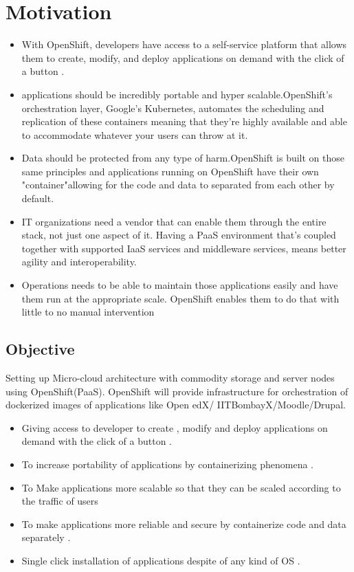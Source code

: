 \documentclass[11pt]{report}
\begin{document}
	\chapter{Motivation}
	\vspace{1cm}
	\large
	\begin{itemize}
		\item
		With OpenShift, developers have access to a self-service platform that allows them to create, modify, and deploy applications on demand with the click of a button .
		\vspace{0.3cm}
		\item 
		applications should be incredibly portable and hyper scalable.OpenShift's orchestration layer, Google’s Kubernetes, automates the scheduling and replication of these containers meaning that they're highly available and able to accommodate whatever your users can throw at it.
		\vspace{0.3cm}
		\item
		Data should be protected from any type of harm.OpenShift is built on those same principles and applications running on OpenShift have their own "container"allowing for the code and data to separated from each other by default.
		\vspace{0.3cm}
		\item
		IT organizations need a vendor that can enable them through the entire stack, not just one aspect of it. Having a PaaS environment that’s coupled together with supported IaaS services and middleware services, means better agility and interoperability.
		\vspace{0.3cm}
		\item
		Operations needs to be able to maintain those applications easily and have them run at the appropriate scale. OpenShift enables them to do that with little to no manual intervention
	\end{itemize}
	\section{Objective}
	Setting up Micro-cloud architecture with commodity storage and server nodes using OpenShift(PaaS). OpenShift will provide infrastructure for orchestration of dockerized images of applications like Open edX/ IITBombayX/Moodle/Drupal.
	
	\begin{itemize}
		\item Giving access to developer to create , modify and deploy applications on demand with the click of a button .
		\item To increase portability of applications by containerizing phenomena . 
		\item To Make applications more scalable so that they can be scaled according to the traffic of users
		\item To make applications more reliable and secure by containerize code and data separately .
		\item Single click installation of applications despite of any kind of OS .
	\end{itemize}
	\vspace{0.8cm}
\end{document}
